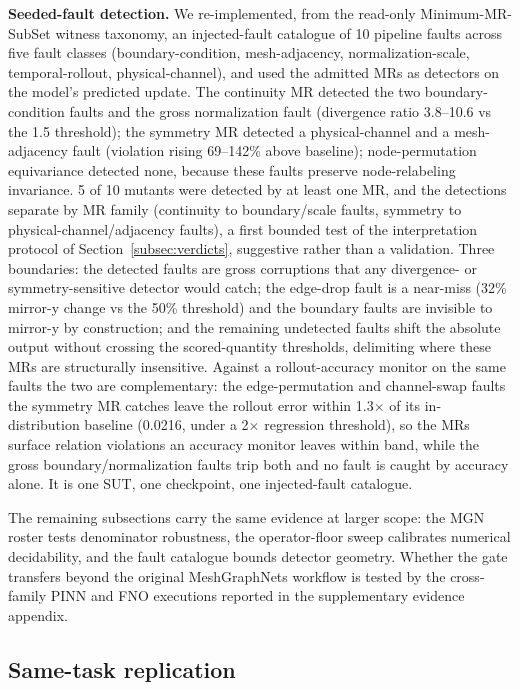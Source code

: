 \documentclass[preprint,12pt,authoryear]{elsarticle}
\begin{document}
\textbf{Seeded-fault detection.} We re-implemented, from the read-only Minimum-MR-SubSet witness taxonomy, an injected-fault catalogue of 10 pipeline faults across five fault classes (boundary-condition, mesh-adjacency, normalization-scale, temporal-rollout, physical-channel), and used the admitted MRs as detectors on the model's predicted update. The continuity MR detected the two boundary-condition faults and the gross normalization fault (divergence ratio 3.8--10.6 vs the 1.5 threshold); the symmetry MR detected a physical-channel and a mesh-adjacency fault (violation rising 69--142\% above baseline); node-permutation equivariance detected none, because these faults preserve node-relabeling invariance. 5 of 10 mutants were detected by at least one MR, and the detections separate by MR family (continuity to boundary/scale faults, symmetry to physical-channel/adjacency faults), a first bounded test of the interpretation protocol of Section~\ref{subsec:verdicts}, suggestive rather than a validation. Three boundaries: the detected faults are gross corruptions that any divergence- or symmetry-sensitive detector would catch; the edge-drop fault is a near-miss (32\% mirror-y change vs the 50\% threshold) and the boundary faults are invisible to mirror-y by construction; and the remaining undetected faults shift the absolute output without crossing the scored-quantity thresholds, delimiting where these MRs are structurally insensitive. Against a rollout-accuracy monitor on the same faults the two are complementary: the edge-permutation and channel-swap faults the symmetry MR catches leave the rollout error within 1.3$\times$ of its in-distribution baseline (0.0216, under a 2$\times$ regression threshold), so the MRs surface relation violations an accuracy monitor leaves within band, while the gross boundary/normalization faults trip both and no fault is caught by accuracy alone. It is one SUT, one checkpoint, one injected-fault catalogue.

The remaining subsections carry the same evidence at larger scope: the MGN roster tests denominator robustness, the operator-floor sweep calibrates numerical decidability, and the fault catalogue bounds detector geometry. Whether the gate transfers beyond the original MeshGraphNets workflow is tested by the cross-family PINN and FNO executions reported in the supplementary evidence appendix.

\subsection{Same-task replication}
\label{subsec:multicheckpoint-replication}
\end{document}
